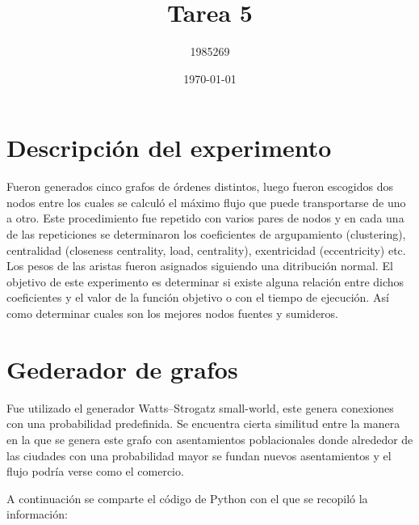 \documentclass[a4paper, 11pt]{article}
\title{Tarea 5}
\date{\today}
\author{1985269}
\begin{document}
\maketitle

\section{Descripci\'on del experimento}
Fueron generados cinco grafos de \'ordenes distintos, luego fueron escogidos dos nodos entre los cuales se calcul\'o el m\'aximo flujo que puede transportarse de uno a otro. Este procedimiento fue repetido con varios pares de nodos y en cada una de las repeticiones se determinaron los coeficientes de argupamiento (clustering), centralidad (closeness centrality, load, centrality),  exentricidad (eccentricity) etc. Los pesos de las aristas fueron asignados siguiendo una ditribuci\'on normal. El objetivo de este experimento es determinar si existe alguna relaci\'on entre dichos coeficientes y el valor de la funci\'on objetivo o con el tiempo de ejecuci\'on. As\'i como determinar cuales son los mejores nodos fuentes y sumideros. 


\section{Gederador de grafos}
Fue utilizado el generador Watts–Strogatz small-world, este genera conexiones con una probabilidad predefinida. Se encuentra cierta similitud entre la manera en la que se genera este grafo con asentamientos poblacionales donde alrededor de las ciudades con una probabilidad mayor se fundan nuevos asentamientos y el flujo podr\'ia verse como el comercio.


A continuaci\'on se comparte el c\'odigo de Python con el que se recopil\'o la informaci\'on:
\newpage

\end{document}
